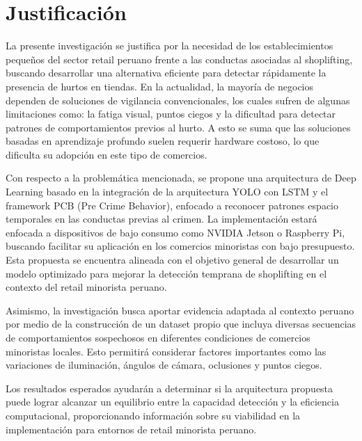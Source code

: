 	\section{Justificación}
	
La presente investigación se justifica por la necesidad de los establecimientos pequeños del sector retail peruano frente a las conductas asociadas al shoplifting, buscando desarrollar una alternativa eficiente para detectar rápidamente la presencia de hurtos en tiendas. En la actualidad, la mayoría de negocios dependen de soluciones de vigilancia convencionales, los cuales sufren de algunas limitaciones como: la fatiga visual, puntos ciegos y la dificultad para detectar patrones de comportamientos previos al hurto. A esto se suma que las soluciones basadas en aprendizaje profundo suelen requerir hardware costoso, lo que dificulta su adopción en este tipo de comercios.

Con respecto a la problemática mencionada, se propone una arquitectura de Deep Learning basado en la integración de la arquitectura YOLO con LSTM y el framework PCB (Pre Crime Behavior), enfocado a reconocer patrones espacio temporales en las conductas previas al crimen. La implementación estará enfocada a dispositivos de bajo consumo como NVIDIA Jetson o Raspberry Pi, buscando facilitar su aplicación en los comercios minoristas con bajo presupuesto. Esta propuesta se encuentra alineada con el objetivo general de desarrollar un modelo optimizado para mejorar la detección temprana de shoplifting en el contexto del retail minorista peruano.

Asimismo, la investigación busca aportar evidencia adaptada al contexto peruano por medio de la construcción de un dataset propio que incluya diversas secuencias de comportamientos sospechosos en diferentes condiciones de comercios minoristas locales. Esto permitirá considerar factores importantes como las variaciones de iluminación, ángulos de cámara, oclusiones y puntos ciegos.

Los resultados esperados ayudarán a determinar si la arquitectura propuesta puede lograr alcanzar un equilibrio entre la capacidad detección y la eficiencia computacional, proporcionando información sobre su viabilidad en la implementación para entornos de retail minorista peruano.
